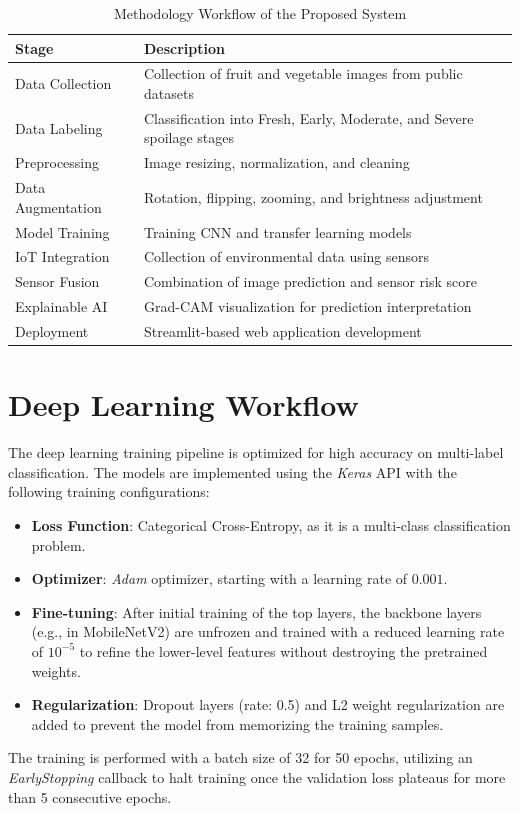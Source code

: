 \begin{table}[H]
	\centering
	\caption{Methodology Workflow of the Proposed System}
	\label{tab:methodology_workflow}
	\begin{tabular}{|l|l|}
		\hline
		\textbf{Stage} & \textbf{Description} \\ \hline
		Data Collection & Collection of fruit and vegetable images from public datasets \\ \hline
		Data Labeling & Classification into Fresh, Early, Moderate, and Severe spoilage stages \\ \hline
		Preprocessing & Image resizing, normalization, and cleaning \\ \hline
		Data Augmentation & Rotation, flipping, zooming, and brightness adjustment \\ \hline
		Model Training & Training CNN and transfer learning models \\ \hline
		IoT Integration & Collection of environmental data using sensors \\ \hline
		Sensor Fusion & Combination of image prediction and sensor risk score \\ \hline
		Explainable AI & Grad-CAM visualization for prediction interpretation \\ \hline
		Deployment & Streamlit-based web application development \\ \hline
	\end{tabular}
\end{table}

\section[Deep Learning Workflow]{\textbf{Deep Learning Workflow}}
The deep learning training pipeline is optimized for high accuracy on multi-label classification. The models are implemented using the \textit{Keras} API with the following training configurations:
\begin{itemize}
    \item \textbf{Loss Function}: Categorical Cross-Entropy, as it is a multi-class classification problem.
    \item \textbf{Optimizer}: \textit{Adam} optimizer, starting with a learning rate of $0.001$.
    \item \textbf{Fine-tuning}: After initial training of the top layers, the backbone layers (e.g., in MobileNetV2) are unfrozen and trained with a reduced learning rate of $10^{-5}$ to refine the lower-level features without destroying the pretrained weights.
    \item \textbf{Regularization}: Dropout layers (rate: 0.5) and L2 weight regularization are added to prevent the model from memorizing the training samples.
\end{itemize}
The training is performed with a batch size of 32 for 50 epochs, utilizing an \textit{EarlyStopping} callback to halt training once the validation loss plateaus for more than 5 consecutive epochs.

